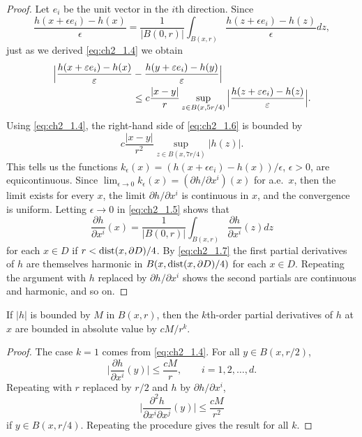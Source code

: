 \begin{proof}
Let $e_i$ be the unit vector in the $i$th direction. Since
\begin{equation}\label{eq:ch2_1.5}
    \frac{h(x + \epsilon e_i) - h(x)}{\epsilon} = \frac{1}{|B(0,r)|} \int_{B(x,r)} \frac{h(z + \epsilon e_i) - h(z)}{\epsilon}dz,
\end{equation}
just as we derived \eqref{eq:ch2_1.4} we obtain
\begin{align}\label{eq:ch2_1.6}
    \Big|\frac{h(x + \epsilon e_i) - h(x)}{\epsilon} &- \frac{h(y + \epsilon e_i) - h(y)}{\epsilon}\Big| \\
    &\leq c\frac{|x-y|}{r} \sup_{z\in B(x,5r/4)}\Big|\frac{h(z + \epsilon e_i) - h(z)}{\epsilon}\Big|.\notag
\end{align}
Using \eqref{eq:ch2_1.4}, the right-hand side of \eqref{eq:ch2_1.6} is bounded by
\[
    c\frac{|x-y|}{r^2} \sup_{z\in B(x,7r/4)} |h(z)|.
\]
This tells us the functions $k_\epsilon(x) = (h(x+\epsilon e_i) - h(x))/\epsilon$, $\epsilon > 0$, are equicontinuous. Since $\lim_{\epsilon\to 0} k_\epsilon(x) = (\partial h/\partial x^i)(x)$ for a.e.\ $x$, then the limit exists for every $x$, the limit $\partial h/\partial x^i$ is continuous in $x$, and the convergence is uniform. Letting $\epsilon \to 0$ in \eqref{eq:ch2_1.5} shows that
\begin{equation}\label{eq:ch2_1.7}
    \frac{\partial h}{\partial x^i}(x) = \frac{1}{|B(0,r)|} \int_{B(x,r)} \frac{\partial h}{\partial x^i}(z)dz
\end{equation}
for each $x \in D$ if $r < \dist(x,\partial D)/4$. By \eqref{eq:ch2_1.7} the first partial derivatives of $h$ are themselves harmonic in $B(x,\dist(x,\partial D)/4)$ for each $x \in D$. Repeating the argument with $h$ replaced by $\partial h/\partial x^i$ shows the second partials are continuous and harmonic, and so on.
\end{proof}

\begin{corollary}\label{cor:ch2_1.4}
If $|h|$ is bounded by $M$ in $B(x,r)$, then the $k$th-order partial derivatives of $h$ at $x$ are bounded in absolute value by $cM/r^k$.
\end{corollary}

\begin{proof}
The case $k=1$ comes from \eqref{eq:ch2_1.4}. For all $y \in B(x,r/2)$,
\[
    \Big|\frac{\partial h}{\partial x^i}(y)\Big| \leq \frac{cM}{r}, \qquad i=1,2,\ldots,d.
\]
Repeating with $r$ replaced by $r/2$ and $h$ by $\partial h/\partial x^i$,
\[
    \Big|\frac{\partial^2 h}{\partial x^i\partial x^j}(y)\Big| \leq \frac{cM}{r^2}
\]
\mnewpage
if $y \in B(x,r/4)$. Repeating the procedure gives the result for all $k$.
\end{proof}

